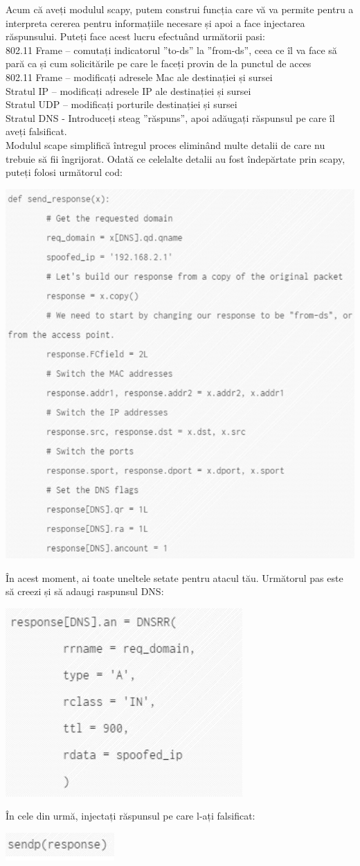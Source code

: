 \documentclass[oneside,20pt]{article}          %
\begin{document}
Acum că aveți modulul scapy, putem construi funcția care vă va permite
pentru a interpreta cererea pentru informațiile necesare și apoi a face injectarea răspunsului. Puteți
face acest lucru efectuând următorii pasi:\\
802.11 Frame – comutați indicatorul ”to-ds” la ”from-ds”, ceea ce îl va face să pară
ca și cum solicitările pe care le faceți provin de la punctul de acces\\
802.11 Frame – modificați adresele Mac ale destinației și sursei\\
Stratul IP – modificați adresele IP ale destinației și sursei\\
Stratul UDP – modificați porturile destinației și sursei\\
Stratul DNS - Introduceți steag ”răspuns”, apoi adăugați răspunsul pe care îl aveți
falsificat.\\
Modulul scape simplifică întregul proces eliminând multe detalii de care
nu trebuie să fii îngrijorat. Odată ce celelalte detalii au fost îndepărtate
prin scapy, puteți folosi următorul cod:
\begin{center}
\includegraphics[height=5 cm]{5.png}
\end{center}
În acest moment, ai toate uneltele setate pentru atacul tău. Următorul pas este să creezi și să adaugi
raspunsul DNS:
\begin{center}
\includegraphics[height=3 cm]{6.png}
\end{center}
În cele din urmă, injectați răspunsul pe care l-ați falsificat:
\begin{center}
\includegraphics[height=0.5 cm]{7.png}
\end{center}
\end{document}
